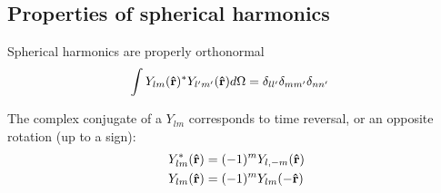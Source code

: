 \documentclass[letterpaper,twocolumn,amsmath,amssymb,pre]{revtex4-1}
\begin{document}
\subsection{Properties of spherical harmonics}

Spherical harmonics are properly orthonormal
\begin{align}
  \int Y_{lm}(\mathbf{\hat{r}})^{*}Y_{l'm'}(\mathbf{\hat{r}}) d\Omega
  &= \delta_{ll'}\delta_{mm'}\delta_{nn'}
\end{align}

The complex conjugate of a $Y_{lm}$ corresponds to time reversal, or
an opposite rotation (up to a sign):
\begin{align}
  Y_{lm}^{*}(\mathbf{\hat{r}}) &= (-1)^{m} Y_{l,-m}(\mathbf{\hat{r}}) \\
  Y_{lm}(\mathbf{\hat{r}}) &= (-1)^{m} Y_{lm}(-\mathbf{\hat{r}})
\end{align}
\end{document}
